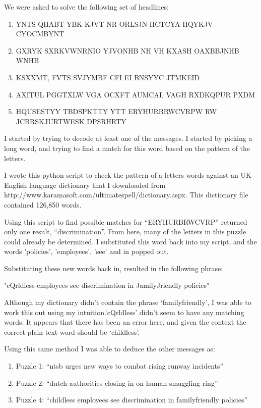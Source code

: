 \documentclass[11pt,a4paper,twoside]{article}
\begin{document}
We were asked to solve the following set of headlines: 

\begin{enumerate}[noitemsep]
\item YNTS QHABT YBK KJVT NR ORLSJN HCTCYA HQYKJV CYOCMBYNT 
\item GXRYK SXRKVWNRNIO YJVONHB NH VH KXASH OAXBBJNHB WNHB 
\item KSXXMT, FVTS SVJYMBF CFI EI BNSYYC JTMKEID 
\item AXITUL PGGTXLW VGA OCXFT AUMCAL VAGH RXDKQPUR PXDM
\item HQUSESTYY TBDSPKTTY YTT ERYHURBRWCVRPW RW JCBRSKJURTWESK DPSRHRTY
\end{enumerate}

I started by trying to decode at least one of the messages. I started by
picking a long word, and trying to find a match for this word based on the
pattern of the letters. 

I wrote this python script to check the pattern of a letters words against an
UK English language dictionary that I downloaded from
http://www.karamasoft.com/ultimatespell/dictionary.aspx. This dictionary file
contained 126,850 words. 

Using this script to find possible matches for ``ERYHURBRWCVRP'' returned only
one result, ``discrimination''. From here, many of the letters in this puzzle
could already be determined. I substituted this word back into my script, and
the words 'policies', 'employees', 'see' and in popped out. 

Substituting these new words back in, resulted in the following phrase: 

"cQrldless employees see discrimination in JamilyJriendly policies"

Although my dictionary didn't contain the phrase `familyfriendly', I was able
to work this out using my intuition.`cQrldless' didn't seem to have any
matching words. It appears that there has been an error here, and given the
context the correct plain text word should be `childless'. 

Using this same method I was able to deduce the other messages as:
\begin{enumerate}[noitemsep]
\item Puzzle 1: ``ntsb urges new ways to combat rising runway incidents''
\item Puzzle 2: ``dutch authorities closing in on human smuggling ring''
\item Puzzle 4: ``childless employees see discrimination in familyfriendly policies''
\end{enumerate}
\end{document}
